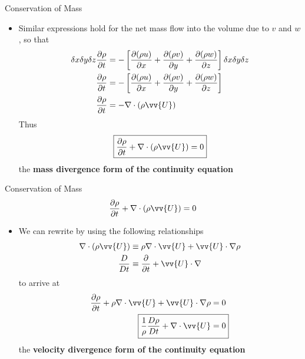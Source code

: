 \begin{frame}{Conservation of Mass}

\begin{itemize}
	\item Similar expressions hold for the net mass flow into the volume due to $v$ and $w$, so that
	\begin{align*}
	\delta x \delta y \delta z \frac{\partial \rho}{\partial t} &= -\left[\frac{\partial (\rho u)}{\partial x} + \frac{\partial (\rho v)}{\partial y} + \frac{\partial (\rho w)}{\partial z}\right] \delta x \delta y \delta z\\
	\frac{\partial \rho}{\partial t} &= -\left[\frac{\partial (\rho u)}{\partial x} + \frac{\partial (\rho v)}{\partial y} + \frac{\partial (\rho w)}{\partial z}\right]\\
	\frac{\partial \rho}{\partial t} &= - \nabla \cdot (\rho \vv{U})
	\end{align*}
	Thus $$\boxed{\frac{\partial \rho}{\partial t} + \nabla \cdot (\rho \vv{U}) = 0}$$
	the \textbf{mass divergence form of the continuity equation}
	\end{itemize}
\end{frame}
\begin{frame}{Conservation of Mass}
$$\frac{\partial \rho}{\partial t} + \nabla \cdot (\rho \vv{U}) = 0$$
\begin{itemize}
	\item We can rewrite by using the following relationships
	\begin{align*}
	\nabla \cdot (\rho \vv{U}) &\equiv \rho \nabla \cdot \vv{U} + \vv{U} \cdot \nabla \rho\\
	\frac{D}{Dt} &\equiv \frac{\partial}{\partial t} + \vv{U} \cdot \nabla
	\end{align*}
	to arrive at
	\begin{align*}
		\frac{\partial \rho}{\partial t} + \rho \nabla \cdot \vv{U} + \vv{U} \cdot \nabla \rho &= 0\\
		\Aboxed{\frac{1}{\rho}\frac{D\rho}{Dt} + \nabla \cdot \vv{U} &= 0}
	\end{align*}
	the \textbf{velocity divergence form of the continuity equation}
\end{itemize}
\end{frame}

